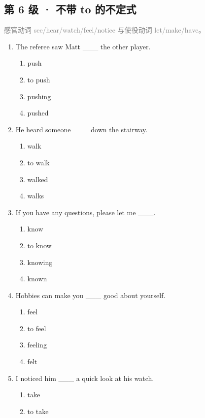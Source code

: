 \documentclass[11pt,a4paper]{ctexart}
\begin{document}
\subsection*{第 6 级 · 不带 to 的不定式}
\noindent\textcolor{gray}{感官动词 see/hear/watch/feel/notice 与使役动词 let/make/have。}\par\smallskip
\begin{enumerate}[leftmargin=*,itemsep=4pt]
\item The referee saw Matt \_\_\_ the other player.
\begin{enumerate}[label=\Alph*.,leftmargin=2em,itemsep=1pt,topsep=2pt]
\item push
\item to push
\item pushing
\item pushed
\end{enumerate}
\item He heard someone \_\_\_ down the stairway.
\begin{enumerate}[label=\Alph*.,leftmargin=2em,itemsep=1pt,topsep=2pt]
\item walk
\item to walk
\item walked
\item walks
\end{enumerate}
\item If you have any questions, please let me \_\_\_.
\begin{enumerate}[label=\Alph*.,leftmargin=2em,itemsep=1pt,topsep=2pt]
\item know
\item to know
\item knowing
\item known
\end{enumerate}
\item Hobbies can make you \_\_\_ good about yourself.
\begin{enumerate}[label=\Alph*.,leftmargin=2em,itemsep=1pt,topsep=2pt]
\item feel
\item to feel
\item feeling
\item felt
\end{enumerate}
\item I noticed him \_\_\_ a quick look at his watch.
\begin{enumerate}[label=\Alph*.,leftmargin=2em,itemsep=1pt,topsep=2pt]
\item take
\item to take

\end{enumerate}
\end{enumerate}
\end{document}
